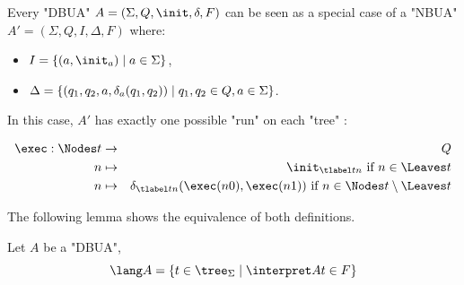 \documentclass[twoside]{article}
\begin{document}
\begin{remark}
	Every "DBUA" $A = (\Sigma, Q, \init, \delta, F)$ can be seen as a special case of a "NBUA"
	$A' = (\Sigma, Q, I, \Delta, F)$ where:
	\begin{itemize}
		\item $I = \setdef{(a, \init_a)}{a \in \Sigma}$,
		\item $\Delta = \left\{(q_1, q_2, a, \delta_a(q_1, q_2)) \mid q_1, q_2 \in Q, a \in \Sigma\right\}$.
	\end{itemize}

	In this case, $A'$ has exactly one possible "run" on each "tree" :

	\begin{eqnarray*}
		\exec : \Nodes t &\to & Q \\
		n  &\mapsto& \init_{\tlabel t n} \text{ if } n \in \Leaves t \\
		n  &\mapsto& \delta_{\tlabel t n}(\exec (n0), \exec (n1)) \text{ if } n \in \Nodes t \setminus \Leaves t
	\end{eqnarray*}
\end{remark}

The following lemma shows the equivalence of both definitions.

\begin{lemma}
	Let $A$ be a "DBUA",
	\[ \lang A = \setdef {t \in \tree_{\Sigma}} {\interpret A t \in F} \]
\end{lemma}
\end{document}
